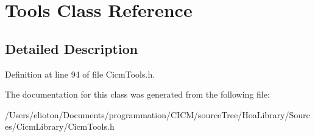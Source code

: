 \hypertarget{class_tools}{\section{Tools Class Reference}
\label{class_tools}
}


\subsection{Detailed Description}


Definition at line 94 of file Cicm\-Tools.\-h.



The documentation for this class was generated from the following file\-:\begin{DoxyCompactItemize}
\item 
/\-Users/elioton/\-Documents/programmation/\-C\-I\-C\-M/source\-Tree/\-Hoa\-Library/\-Sources/\-Cicm\-Library/Cicm\-Tools.\-h\end{DoxyCompactItemize}
